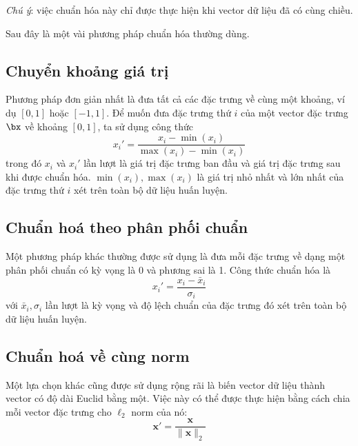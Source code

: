 \textit{Chú ý}: việc chuẩn hóa này chỉ được thực hiện khi vector dữ liệu đã có cùng chiều. 
 
Sau đây là một vài phương pháp chuẩn hóa thường dùng.

\subsection{Chuyển khoảng giá trị}
Phương pháp đơn giản nhất là đưa tất cả các đặc trưng về cùng một khoảng, ví dụ $[0, 1]$ hoặc $[-1, 1]$. Để muốn đưa đặc trưng thứ
$i$ của một vector đặc trưng $\bx$ về khoảng $[0, 1]$, ta sử dụng công thức
\begin{equation*} 
x_i' = \frac{x_i - \min(x_i)}{\max(x_i) - \min(x_i)} 
\end{equation*} 
trong đó $x_i$ và $x_i'$ lần lượt là giá trị đặc trưng ban đầu và giá trị đặc
trưng sau khi được chuẩn hóa. $\min(x_i), \max(x_i)$ là giá trị nhỏ nhất và lớn
nhất của đặc trưng thứ $i$ xét trên toàn bộ dữ liệu huấn luyện.
 
 
\subsection{Chuẩn hoá theo phân phối chuẩn}
Một phương pháp khác thường được sử dụng là đưa mỗi đặc trưng về dạng một
phân phối chuẩn có kỳ vọng là 0 và phương sai là 1. Công thức chuẩn hóa
là 
\begin{equation*} 
x_i' = \frac{x_i - \bar{x}_i}{\sigma_i} 
\end{equation*} 
với $\bar{x}_i, \sigma_i$ lần lượt là kỳ vọng và độ lệch chuẩn của đặc trưng đó
xét trên toàn bộ dữ liệu huấn luyện.
 
\subsection{Chuẩn hoá về cùng norm}
Một lựa chọn khác cũng được sử dụng rộng rãi là biến vector dữ liệu thành vector
có độ dài Euclid bằng một. Việc này có thể được thực hiện bằng cách chia mỗi
vector đặc trưng cho $\ell_2$ norm của nó:
\begin{equation*}
\mathbf{x}' = \frac{\mathbf{x}}{\|\mathbf{x}\|_2} 
\end{equation*} 
 
 
    
